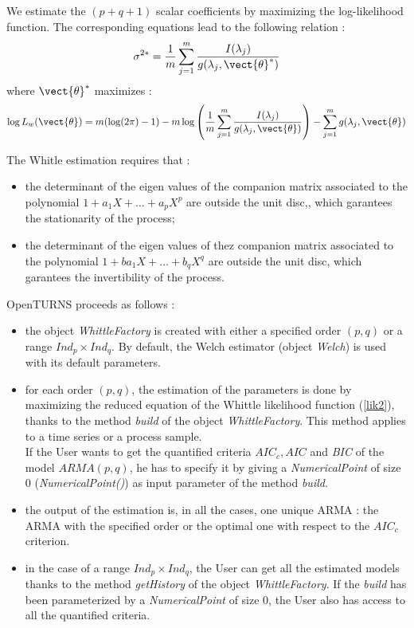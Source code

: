 We estimate the $(p+q+1)$ scalar coefficients by maximizing the log-likelihood function. The corresponding equations lead to the following relation :
\begin{equation}\label{optSigma}
  \sigma^{2*} = \frac{1}{m} \sum_{j=1}^{m} \frac{I(\lambda_j)}{g(\lambda_j, \vect{\theta}^{*})}
\end{equation}
where $ \vect{\theta}^{*}$ maximizes :
\begin{equation}\label{lik2}
  \log L_w(\vect{\theta}) = m (\log(2 \pi) - 1) - m \log\left( \frac{1}{m} \sum_{j=1}^{m} \frac{I(\lambda_j)}{g(\lambda_j, \vect{\theta})}\right) - \sum_{j=1}^{m} g(\lambda_j, \vect{\theta})
\end{equation}


The Whitle estimation requires that :
\begin{itemize}
\item the determinant of the eigen values of the companion matrix associated to the polynomial  $1 + a_1X + \dots + a_pX^p$ are  outside the unit disc,, which garantees the stationarity of the process;
\item the determinant of the eigen values of thez companion matrix associated to the polynomial  $1 + ba_1X + \dots + b_qX^q$ are outside the unit disc, which garantees the invertibility of the process.
\end{itemize}

OpenTURNS proceeds as follows :
\begin{itemize}
\item the object \emph{WhittleFactory} is created  with  either a specified order $(p,q)$  or a range $Ind_p \times Ind_q$. By default, the Welch estimator (object \textit{Welch}) is used with its default parameters.
\item for each order $(p,q)$, the estimation of the parameters is done by maximizing the reduced equation of the Whittle likelihood function (\ref{lik2}), thanks to the method \emph{build} of the object  \emph{WhittleFactory}. This method applies to a time series or a process sample. \\
  If the User wants to get the quantified criteria $AIC_c, AIC$ and \textit{BIC} of the model $ARMA(p,q)$, he has to specify it by giving a \textit{NumericalPoint} of size 0 (\textit{NumericalPoint()}) as input parameter of the method \emph{build}.
\item the output of the estimation is, in all the cases, one unique ARMA : the ARMA with the specified order or the optimal one with respect to the  $AIC_c$ criterion.
\item in the case of a range $Ind_p \times Ind_q$, the User can get all the estimated models thanks to the method \emph{getHistory} of the object \emph{WhittleFactory}. If the \emph{build} has been parameterized by a \textit{NumericalPoint} of size 0, the User also has access to all the quantified criteria.
\end{itemize}




